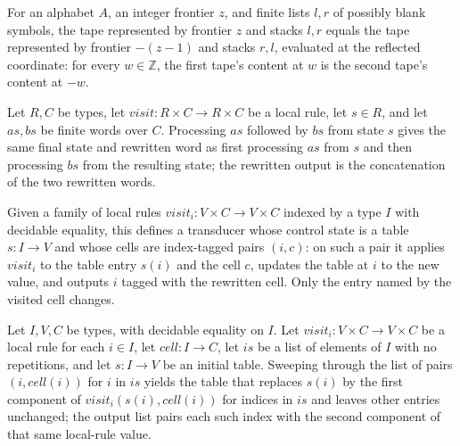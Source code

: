 \begin{lemma}
\label{Turing.FinTM.sweepTape_turn}
\leanok
{}
For an alphabet $A$, an integer frontier $z$, and finite lists $l,r$ of possibly blank
symbols, the tape represented by frontier $z$ and stacks $l,r$ equals the tape
represented by frontier $-(z-1)$ and stacks $r,l$, evaluated at the reflected
coordinate: for every $w\in\mathbb{Z}$, the first tape's content at $w$ is the second
tape's content at $-w$.
\end{lemma}

\begin{lemma}
\label{Turing.FinTM.sweepFold_append}
\leanok
{}
Let $R,C$ be types, let $visit\colon R\times C\to R\times C$ be a local rule, let $s\in
R$, and let $as,bs$ be finite words over $C$. Processing $as$ followed by $bs$ from
state $s$ gives the same final state and rewritten word as first processing $as$ from
$s$ and then processing $bs$ from the resulting state; the rewritten output is the
concatenation of the two rewritten words.
\end{lemma}

\begin{definition}
\label{Turing.FinTM.indexedVisit}
\leanok
Given a family of local rules $\mathit{visit}_i \colon V \times C \to
V \times C$ indexed by a type $I$ with decidable equality, this defines a
transducer whose control state is a table $s \colon I \to V$ and whose cells
are index-tagged pairs $(i, c)$: on such a pair it applies $\mathit{visit}_i$
to the table entry $s(i)$ and the cell $c$, updates the table at $i$ to the
new value, and outputs $i$ tagged with the rewritten cell. Only the entry
named by the visited cell changes.
\end{definition}

\begin{lemma}
\label{Turing.FinTM.indexedFold}
\leanok
{}
Let $I,V,C$ be types, with decidable equality on $I$. Let $\mathit{visit}_i:V\times C\to
V\times C$ be a local rule for each $i\in I$, let $\mathit{cell}:I\to C$, let
$\mathit{is}$ be a list of elements of $I$ with no repetitions, and let $s:I\to V$ be an
initial table. Sweeping through the list of pairs $(i,\mathit{cell}(i))$ for $i$ in
$\mathit{is}$ yields the table that replaces $s(i)$ by the first component of
$\mathit{visit}_i(s(i),\mathit{cell}(i))$ for indices in $\mathit{is}$ and leaves other
entries unchanged; the output list pairs each such index with the second component of
that same local-rule value.
\end{lemma}

